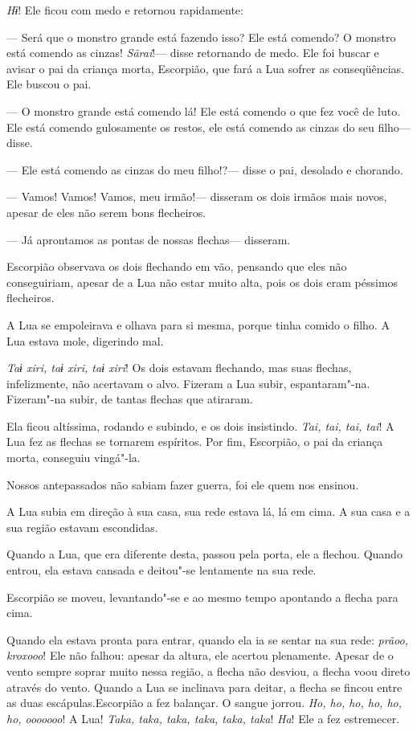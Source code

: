 \emph{Hɨ}! Ele ficou com medo e retornou rapidamente: 

--- Será que o monstro grande está fazendo isso? Ele está comendo? O
monstro está comendo as cinzas! \emph{Sãrai}!--- disse retornando de
medo. Ele foi buscar e avisar o pai da criança morta, Escorpião, que
fará a Lua sofrer as conseqüências. Ele buscou o pai. 

--- O monstro grande está comendo lá! Ele está comendo o que fez você de
luto. Ele está comendo gulosamente os restos, ele está comendo as cinzas
do seu filho--- disse. 

--- Ele está comendo as cinzas do meu filho!?--- disse o pai, desolado e
chorando. 

--- Vamos! Vamos! Vamos, meu irmão!--- disseram os dois irmãos mais
novos, apesar de eles não serem bons flecheiros. 

--- Já aprontamos as pontas de nossas flechas--- disseram. 

Escorpião observava os dois flechando em vão, pensando que eles não
conseguiriam, apesar de a Lua não estar muito alta, pois os dois eram
péssimos flecheiros. 

A Lua se empoleirava e olhava para si mesma, porque tinha comido o
filho. A Lua estava mole, digerindo mal. 

\emph{Taɨ xiri, taɨ xiri, taɨ xiri}! Os dois estavam flechando, mas suas
flechas, infelizmente, não acertavam o alvo. Fizeram a Lua subir,
espantaram"-na. Fizeram"-na subir, de tantas flechas que atiraram. 

Ela ficou altíssima, rodando e subindo, e os dois insistindo. \emph{Tai,
tai, tai, tai}! A Lua fez as flechas se tornarem espíritos. Por fim,
Escorpião, o pai da criança morta, conseguiu vingá"-la. 

Nossos antepassados não sabiam fazer guerra, foi ele quem nos ensinou. 

A Lua subia em direção à sua casa, sua rede estava lá, lá em cima. A sua
casa e a sua região estavam escondidas. 

Quando a Lua, que era diferente desta, passou pela porta, ele a flechou.
Quando entrou, ela estava cansada e deitou"-se lentamente na sua rede. 

Escorpião se moveu, levantando"-se e ao mesmo tempo apontando a flecha
para cima. 

Quando ela estava pronta para entrar, quando ela ia se sentar na sua
rede: \emph{prãoo, kroxooo}! Ele não falhou: apesar da altura, ele
acertou plenamente. Apesar de o vento sempre soprar muito nessa região,
a flecha não desviou, a flecha voou direto através do vento. Quando a
Lua se inclinava para deitar, a flecha se fincou entre as duas
escápulas.Escorpião a fez balançar. O sangue jorrou. \emph{Ho, ho, ho,
ho, ho, ho, ooooooo}! A Lua! \emph{Taka, taka, taka, taka, taka,
taka}! \emph{Ha}! Ele a fez estremecer. 

